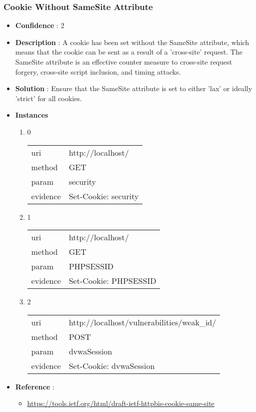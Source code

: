 \documentclass[10pt]{article}
\begin{document}
\subsubsection{Cookie Without SameSite Attribute}
\begin{itemize}
\item[] \textbf{Confidence} : 2
\item[] \textbf{Description} : A cookie has been set without the SameSite attribute, which means that the cookie can be sent as a result of a 'cross-site' request. The SameSite attribute is an effective counter measure to cross-site request forgery, cross-site script inclusion, and timing attacks.
\item[] \textbf{Solution} :  Ensure that the SameSite attribute is set to either 'lax' or ideally 'strict' for all cookies.
\item[] \textbf{Instances}
\begin{enumerate}
\item[] 0
\begin{tabular}{| l | p{14cm}}
uri & http://localhost/ \\
method & GET \\
param & security \\
evidence & Set-Cookie: security \\
\end{tabular}
\item[] 1
\begin{tabular}{| l | p{14cm}}
uri & http://localhost/ \\
method & GET \\
param & PHPSESSID \\
evidence & Set-Cookie: PHPSESSID \\
\end{tabular}
\item[] 2
\begin{tabular}{| l | p{14cm}}
uri & http://localhost/vulnerabilities/weak{\_}id/ \\
method & POST \\
param & dvwaSession \\
evidence & Set-Cookie: dvwaSession \\
\end{tabular}
\end{enumerate}
\item[] \textbf{Reference} : 
\begin{itemize}
\item \url{https://tools.ietf.org/html/draft-ietf-httpbis-cookie-same-site}
\end{itemize}
\end{itemize}
\end{document}
